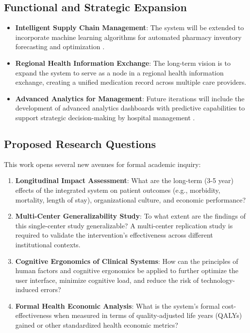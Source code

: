 \subsection{Functional and Strategic Expansion}

\begin{itemize}
    \item \textbf{Intelligent Supply Chain Management}: The system will be extended to incorporate machine learning algorithms for automated pharmacy inventory forecasting and optimization \cite{rozenblum2020}.
    \item \textbf{Regional Health Information Exchange}: The long-term vision is to expand the system to serve as a node in a regional health information exchange, creating a unified medication record across multiple care providers.
    \item \textbf{Advanced Analytics for Management}: Future iterations will include the development of advanced analytics dashboards with predictive capabilities to support strategic decision-making by hospital management \cite{berwick2008}.
\end{itemize}

\subsection{Proposed Research Questions}

This work opens several new avenues for formal academic inquiry:
\begin{enumerate}
    \item \textbf{Longitudinal Impact Assessment}: What are the long-term (3-5 year) effects of the integrated system on patient outcomes (e.g., morbidity, mortality, length of stay), organizational culture, and economic performance? \cite{greenhalgh2017}
    \item \textbf{Multi-Center Generalizability Study}: To what extent are the findings of this single-center study generalizable? A multi-center replication study is required to validate the intervention's effectiveness across different institutional contexts.
    \item \textbf{Cognitive Ergonomics of Clinical Systems}: How can the principles of human factors and cognitive ergonomics be applied to further optimize the user interface, minimize cognitive load, and reduce the risk of technology-induced errors? \cite{holden2011}
    \item \textbf{Formal Health Economic Analysis}: What is the system's formal cost-effectiveness when measured in terms of quality-adjusted life years (QALYs) gained or other standardized health economic metrics? \cite{adler2021}
\end{enumerate}

